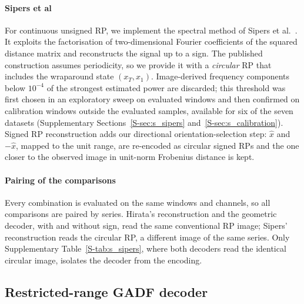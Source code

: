 \documentclass[preprint,review,12pt]{elsarticle}
\begin{document}
\paragraph{Sipers et al}
For continuous unsigned RP, we implement the spectral method of Sipers et al.~\cite{sipers2017robust}. It exploits the factorisation of two-dimensional Fourier coefficients of the squared distance matrix and reconstructs the signal up to a sign. The published construction assumes periodicity, so we provide it with a \emph{circular} RP that includes the wraparound state $(x_T,x_1)$. Image-derived frequency components below $10^{-4}$ of the strongest estimated power are discarded; this threshold was first chosen in an exploratory sweep on evaluated windows and then confirmed on calibration windows outside the evaluated samples, available for six of the seven datasets (Supplementary Sections~\ref{S-sec:s_sipers} and~\ref{S-sec:s_calibration}). Signed RP reconstruction adds our directional orientation-selection step: $\hat x$ and $-\hat x$, mapped to the unit range, are re-encoded as circular signed RPs and the one closer to the observed image in unit-norm Frobenius distance is kept.

\paragraph{Pairing of the comparisons}
Every combination is evaluated on the same windows and channels, so all comparisons are paired by series. Hirata's reconstruction and the geometric decoder, with and without sign, read the same conventional RP image; Sipers' reconstruction reads the circular RP, a different image of the same series. Only Supplementary Table~\ref{S-tab:s_sipers}, where both decoders read the identical circular image, isolates the decoder from the encoding.

\subsection{Restricted-range GADF decoder}\label{sec:gadf_decoder}
\end{document}
